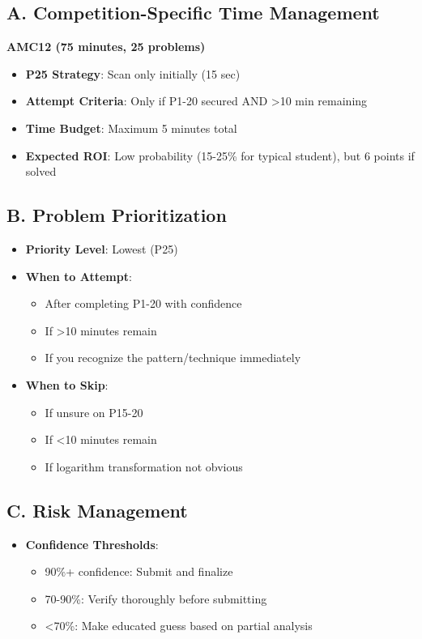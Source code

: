 \documentclass[11pt]{article}
\begin{document}
\begin{competitionbox}
\subsection*{A. Competition-Specific Time Management}
\textbf{AMC12 (75 minutes, 25 problems)}
\begin{itemize}[leftmargin=*]
    \item \textbf{P25 Strategy}: Scan only initially (15 sec)
    \item \textbf{Attempt Criteria}: Only if P1-20 secured AND >10 min remaining
    \item \textbf{Time Budget}: Maximum 5 minutes total
    \item \textbf{Expected ROI}: Low probability (15-25\% for typical student), but 6 points if solved
\end{itemize}

\subsection*{B. Problem Prioritization}
\begin{itemize}[leftmargin=*]
    \item \textbf{Priority Level}: Lowest (P25)
    \item \textbf{When to Attempt}:
    \begin{itemize}
        \item After completing P1-20 with confidence
        \item If >10 minutes remain
        \item If you recognize the pattern/technique immediately
    \end{itemize}
    
    \item \textbf{When to Skip}:
    \begin{itemize}
        \item If unsure on P15-20
        \item If <10 minutes remain
        \item If logarithm transformation not obvious
    \end{itemize}
\end{itemize}

\subsection*{C. Risk Management}
\begin{itemize}[leftmargin=*]
    \item \textbf{Confidence Thresholds}:
    \begin{itemize}
        \item 90\%+ confidence: Submit and finalize
        \item 70-90\%: Verify thoroughly before submitting
        \item <70\%: Make educated guess based on partial analysis
    \end{itemize}
    

\end{itemize}
\end{competitionbox}
\end{document}
